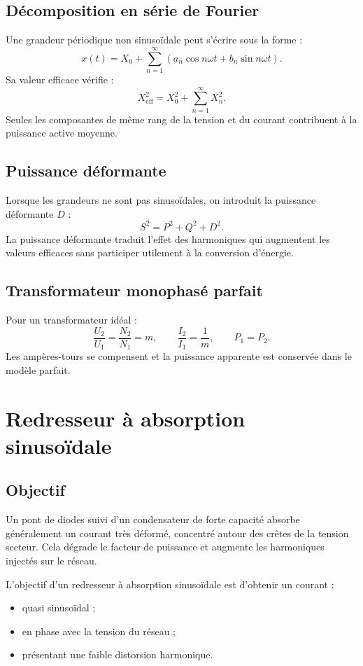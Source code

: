 \subsection{Décomposition en série de Fourier}

Une grandeur périodique non sinusoïdale peut s'écrire sous la forme :
\[
x(t)=X_0+\sum_{n=1}^{\infty}\left(a_n\cos n\omega t+b_n\sin n\omega t\right).
\]
Sa valeur efficace vérifie :
\[
X_{\mathrm{eff}}^2=X_0^2+\sum_{n=1}^{\infty}X_n^2.
\]
Seules les composantes de même rang de la tension et du courant contribuent à la puissance active moyenne.

\subsection{Puissance déformante}

Lorsque les grandeurs ne sont pas sinusoïdales, on introduit la puissance déformante $D$ :
\[
\boxed{S^2=P^2+Q^2+D^2}.
\]
La puissance déformante traduit l'effet des harmoniques qui augmentent les valeurs efficaces sans participer utilement à la conversion d'énergie.

\subsection{Transformateur monophasé parfait}

Pour un transformateur idéal :
\[
\frac{U_2}{U_1}=\frac{N_2}{N_1}=m,
\qquad
\frac{I_2}{I_1}=\frac1m,
\qquad
P_1=P_2.
\]
Les ampères-tours se compensent et la puissance apparente est conservée dans le modèle parfait.

\section{Redresseur à absorption sinusoïdale}

\subsection{Objectif}

Un pont de diodes suivi d'un condensateur de forte capacité absorbe généralement un courant très déformé, concentré autour des crêtes de la tension secteur. Cela dégrade le facteur de puissance et augmente les harmoniques injectés sur le réseau.

L'objectif d'un redresseur à absorption sinusoïdale est d'obtenir un courant :
\begin{itemize}
\item quasi sinusoïdal ;
\item en phase avec la tension du réseau ;
\item présentant une faible distorsion harmonique.
\end{itemize}

